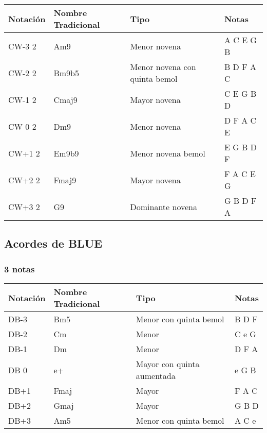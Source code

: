 \documentclass[]{article}
\begin{document}
\begin{table}[H]
  \centering
  \begin{tabularx}{\textwidth}{ll>{\raggedright\arraybackslash}Xl}
\toprule
Notación & Nombre Tradicional & Tipo & Notas \\
\midrule
\textsf{CW-3} 2 & Am9     & Menor novena & A C E G B \\
\textsf{CW-2} 2 & Bm9b5   & Menor novena con quinta bemol & B D F A C \\
\textsf{CW-1} 2 & Cmaj9   & Mayor novena & C E G B D \\
\textsf{CW 0} 2 & Dm9     & Menor novena & D F A C E \\
\textsf{CW+1} 2 & Em9b9   & Menor novena bemol & E G B D F \\
\textsf{CW+2} 2 & Fmaj9   & Mayor novena & F A C E G \\
\textsf{CW+3} 2 & G9      & Dominante novena & G B D F A \\
\bottomrule
\end{tabularx}
\end{table}

\subsection*{Acordes de BLUE}

\subsubsection*{3 notas}

\begin{table}[H]
  \centering
  \begin{tabularx}{\textwidth}{ll>{\raggedright\arraybackslash}Xl}
\toprule
Notación & Nombre Tradicional & Tipo & Notas \\
\midrule
\textsf{DB-3} & Bm5     & Menor con quinta bemol & B D F \\
\textsf{DB-2} & Cm      & Menor & C e G \\
\textsf{DB-1} & Dm      & Menor & D F A \\
\textsf{DB 0} & e+      & Mayor con quinta aumentada & e G B \\
\textsf{DB+1} & Fmaj    & Mayor & F A C \\
\textsf{DB+2} & Gmaj    & Mayor & G B D \\
\textsf{DB+3} & Am5     & Menor con quinta bemol & A C e \\
\bottomrule
\end{tabularx}
\end{table}
\end{document}

